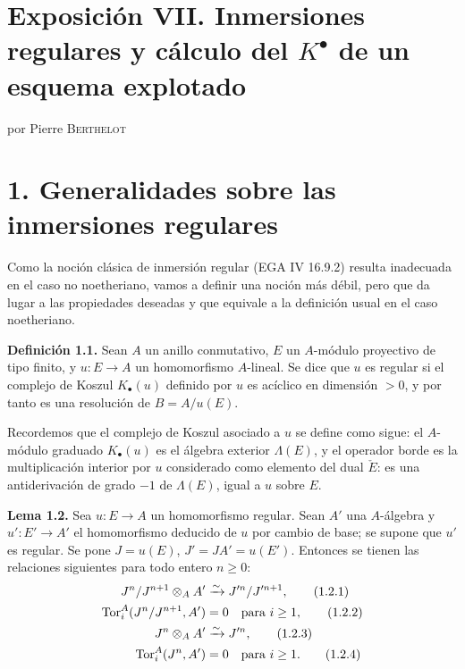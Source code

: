 \providecommand{\sisi}[2]{#2}

\section*{Exposición VII. Inmersiones regulares y cálculo del \texorpdfstring{$K^{\bullet}$}{K0} de un esquema explotado}
\begin{center}
por Pierre \textsc{Berthelot}
\end{center}

\section*{1. Generalidades sobre las inmersiones regulares}

Como la noción clásica de inmersión regular (EGA IV 16.9.2) resulta inadecuada en el caso no noetheriano, vamos a definir una noción más débil, pero que da lugar a las propiedades deseadas y que equivale a la definición usual en el caso noetheriano.

\textbf{Definición 1.1.} Sean $A$ un anillo conmutativo, $E$ un $A$-módulo proyectivo de tipo finito, y $u:E\longrightarrow A$ un homomorfismo $A$-lineal. Se dice que $u$ es regular si el complejo de Koszul $K_\bullet(u)$ definido por $u$ es acíclico en dimensión $>0$, y por tanto es una resolución de $B=A/u(E)$.

Recordemos que el complejo de Koszul asociado a $u$ se define como sigue: el $A$-módulo graduado $K_\bullet(u)$ es el álgebra exterior $\Lambda(E)$, y el operador borde es la multiplicación interior por $u$ considerado como elemento del dual $\check E$: es una antiderivación de grado $-1$ de $\Lambda(E)$, igual a $u$ sobre $E$.

\textbf{Lema 1.2.} Sea $u:E\longrightarrow A$ un homomorfismo regular. Sean $A'$ una $A$-álgebra y $u':E'\longrightarrow A'$ el homomorfismo deducido de $u$ por cambio de base; se supone que $u'$ es regular. Se pone $J=u(E)$, $J'=JA'=u(E')$. Entonces se tienen las relaciones siguientes para todo entero $n\geq0$:
\begin{align}
 J^n/J^{n+1}\otimes_AA'&\xrightarrow{\sim}J'^n/J'^{n+1}, \tag{1.2.1}\\
 \operatorname{Tor}_i^A(J^n/J^{n+1},A')&=0\quad\text{para }i\geq1, \tag{1.2.2}\\
 J^n\otimes_AA'&\xrightarrow{\sim}J'^n, \tag{1.2.3}\\
 \operatorname{Tor}_i^A(J^n,A')&=0\quad\text{para }i\geq1. \tag{1.2.4}
\end{align}

